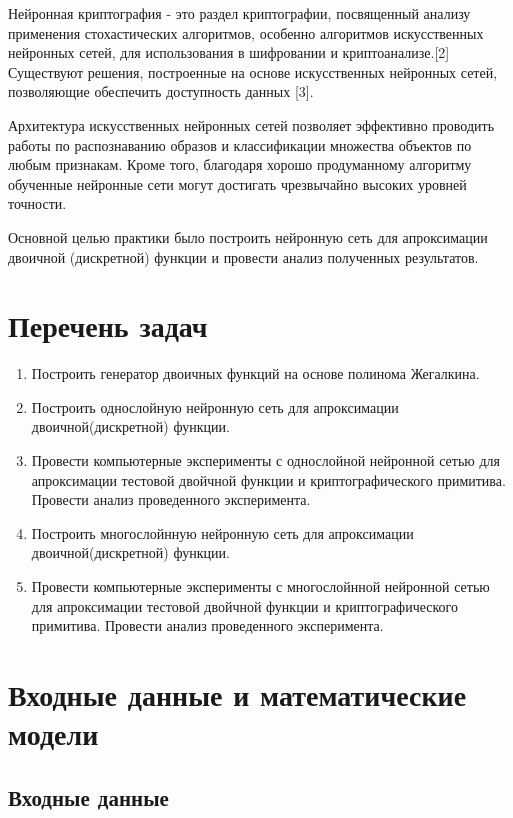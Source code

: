 \documentclass[a4paper,12pt,twoside]{article}
\begin{document}
	Нейронная криптография - это раздел криптографии, посвященный анализу применения стохастических алгоритмов, особенно алгоритмов искусственных нейронных сетей, для использования в шифровании и криптоанализе.[2] Существуют решения, построенные на основе искусственных нейронных сетей, позволяющие обеспечить доступность данных [3].
	
	Архитектура искусственных нейронных сетей позволяет эффективно проводить работы по распознаванию образов и классификации множества объектов по любым признакам. Кроме того, благодаря хорошо продуманному алгоритму обученные нейронные сети могут достигать чрезвычайно высоких уровней точности. 
	
	Основной целью практики было построить нейронную сеть для апроксимации двоичной (дискретной) функции и провести анализ полученных результатов. 
	
	\newpage
	\section{Перечень задач}
	\bigskip
	
	\begin{enumerate}
		\item Построить генератор двоичных функций на основе полинома Жегалкина.
		\item Построить однослойную нейронную сеть для апроксимации двоичной(дискретной) функции.
		\item Провести компьютерные эксперименты с однослойной нейронной сетью для апроксимации тестовой двойчной функции и криптографического примитива. Провести анализ проведенного эксперимента.
		\item Построить многослойнную нейронную сеть для апроксимации двоичной(дискретной) функции.
		\item Провести компьютерные эксперименты с многослойнной нейронной сетью для апроксимации тестовой двойчной функции и криптографического примитива. Провести анализ проведенного эксперимента.
	\end{enumerate}
	
	\newpage
	\section{Входные данные и математические модели}
	\bigskip
	\subsection{Входные данные}
	\bigskip
	
\end{document}
